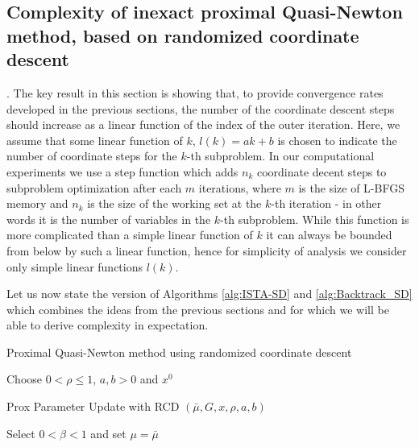 \documentclass[11pt]{article}
\numberwithin{equation}{section}
\begin{document}
\subsection{Complexity of inexact proximal Quasi-Newton method, based on randomized coordinate descent}.
 The key result in this section is showing that, to provide convergence rates developed in the previous sections, the number of the coordinate descent steps should increase as a linear function
of the index of the outer iteration.  Here,  we  assume that some linear function of $k$, $l(k)=ak+b$ is chosen to indicate the number of coordinate steps 
for the $k$-th subproblem.  In our computational experiments we use a step function which adds $n_k$ coordinate decent steps to subproblem optimization after each $m$ iterations, where $m$ is the size of L-BFGS memory and $n_k$ is the size of the working set at the $k$-th iteration - in other words it is the number of variables in the $k$-th subproblem. 
While this function is more complicated than a simple linear function of $k$ it can always be bounded from below by such a linear function, hence for simplicity of analysis we consider only simple linear functions $l(k)$.

Let us now state the version of  Algorithms \ref{alg:ISTA-SD} and \ref{alg:Backtrack_SD} which combines the ideas from the previous sections and for which we will be able to derive complexity in expectation.

\begin{algorithm2e}\caption{Proximal Quasi-Newton method using randomized coordinate descent}
    \label{alg:ISTA-SD_RCD}%
{\rm Choose }
$0<\rho\leq 1$,  $a,b>0$ and  $x^0$\; 
\end{algorithm2e}




\begin{algorithm2e}\caption{Prox Parameter Update with RCD $(\bar \mu, G, x, \rho, a,b)$ }
    \label{alg:Backtrack_SD_RCD}%
Select $0<\beta<1$ and set $\mu=\bar \mu$\; 
\end{algorithm2e}
\end{document}
